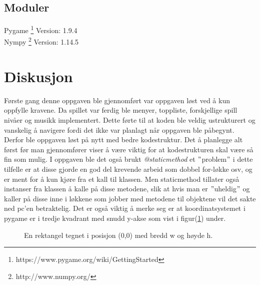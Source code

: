 \documentclass{article}     %
\begin{document}
\subsection{Moduler}
Pygame \footnote{https://www.pygame.org/wiki/GettingStarted} Version: 1.9.4\\
Nympy \footnote{http://www.numpy.org/} Version: 1.14.5\\



\section{Diskusjon}

Første gang denne oppgaven ble gjennomført var oppgaven løst ved å kun oppfylle kravene. Da spillet var ferdig ble menyer, toppliste, forskjellige spill nivåer og musikk implementert. Dette førte til at koden ble veldig ustrukturert og vanskelig å navigere fordi det ikke var planlagt når oppgaven ble påbegynt. Derfor ble oppgaven løst på nytt med bedre kodestruktur. Det å planlegge alt først før man gjennomfører viser å være viktig for at kodestrukturen skal være så fin som mulig. I oppgaven ble det også brukt \emph{@staticmethod} et $"$problem$"$ i dette tilfelle er at disse gjorde en god del krevende arbeid som dobbel for-løkke osv, og er ment for å kun kjøre fra et kall til klassen. Men staticmethod tillater også instanser fra klassen å kalle på disse metodene, slik at hvis man er $"$uheldig$"$ og kaller på disse inne i løkkene som jobber med metodene til objektene vil det sakte ned pc'en betraktelig. Det er også viktig å merke seg er at koordinatsystemet i pygame er i tredje kvadrant med snudd y-akse som vist i figur(\ref{akse}) under.

\begin{figure}[H]
\caption{En rektangel tegnet i posisjon (0,0) med bredd w og høyde h.}
\label{akse}
\end{figure}
\end{document}
